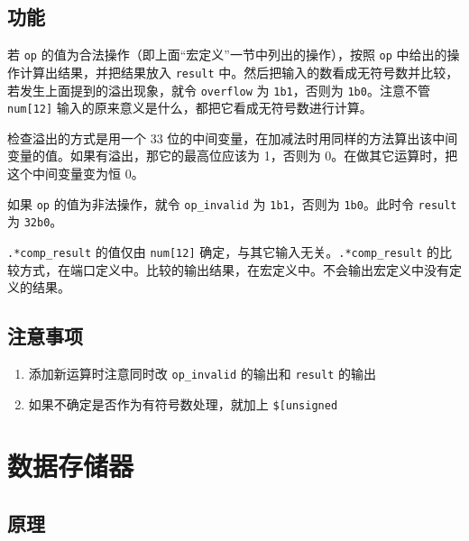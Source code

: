 \documentclass[12pt,AutoFakeBold,AutoFakeSlant]{article}
\providecommand{\tightlist}{%
  \setlength{\itemsep}{0pt}\setlength{\parskip}{0pt}}
\begin{document}
\hypertarget{ux529fux80fd-7}{%
\subsection{功能}\label{ux529fux80fd-7}}

若 \texttt{op} 的值为合法操作（即上面``宏定义''一节中列出的操作），按照
\texttt{op} 中给出的操作计算出结果，并把结果放入 \texttt{result}
中。然后把输入的数看成无符号数并比较，若发生上面提到的溢出现象，就令
\texttt{overflow} 为 \texttt{1\textquotesingle{}b1}，否则为
\texttt{1\textquotesingle{}b0}。注意不管 \texttt{num{[}12{]}}
输入的原来意义是什么，都把它看成无符号数进行计算。

检查溢出的方式是用一个 33
位的中间变量，在加减法时用同样的方法算出该中间变量的值。如果有溢出，那它的最高位应该为
1，否则为 0。在做其它运算时，把这个中间变量变为恒 0。

如果 \texttt{op} 的值为非法操作，就令 \texttt{op\_invalid} 为
\texttt{1\textquotesingle{}b1}，否则为
\texttt{1\textquotesingle{}b0}。此时令 \texttt{result} 为
\texttt{32\textquotesingle{}b0}。

\texttt{.*comp\_result} 的值仅由 \texttt{num{[}12{]}}
确定，与其它输入无关。\texttt{.*comp\_result}
的比较方式，在端口定义中。比较的输出结果，在宏定义中。不会输出宏定义中没有定义的结果。

\hypertarget{ux6ce8ux610fux4e8bux9879-4}{%
\subsection{注意事项}\label{ux6ce8ux610fux4e8bux9879-4}}

\begin{enumerate}
\def\labelenumi{\arabic{enumi}.}
\tightlist
\item
  添加新运算时注意同时改 \texttt{op\_invalid} 的输出和 \texttt{result}
  的输出
\item
  如果不确定是否作为有符号数处理，就加上 \texttt{{\${}[}un\textbar{}{]}signed}
\end{enumerate}

\hypertarget{ux6570ux636eux5b58ux50a8ux5668}{%
\section{数据存储器}\label{ux6570ux636eux5b58ux50a8ux5668}}

\hypertarget{ux539fux7406-4}{%
\subsection{原理}\label{ux539fux7406-4}}
\end{document}
